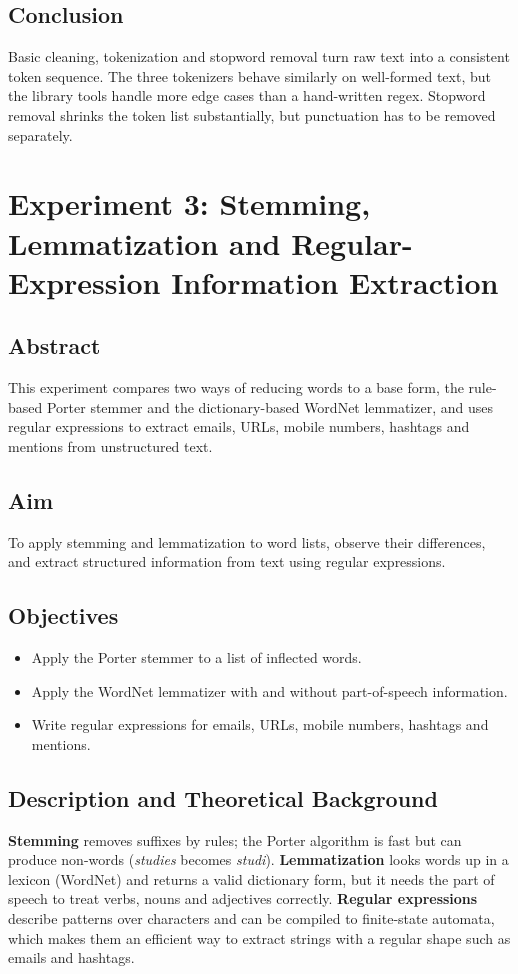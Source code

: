 \documentclass[12pt,a4paper,oneside]{report}
\begin{document}
\section{Conclusion}
Basic cleaning, tokenization and stopword removal turn raw text into a consistent token sequence. The three tokenizers behave similarly on well-formed text, but the library tools handle more edge cases than a hand-written regex. Stopword removal shrinks the token list substantially, but punctuation has to be removed separately.


\chapter{Experiment 3: Stemming, Lemmatization and Regular-Expression Information Extraction}
\section{Abstract}
This experiment compares two ways of reducing words to a base form, the rule-based Porter stemmer and the dictionary-based WordNet lemmatizer, and uses regular expressions to extract emails, URLs, mobile numbers, hashtags and mentions from unstructured text.


\section{Aim}
To apply stemming and lemmatization to word lists, observe their differences, and extract structured information from text using regular expressions.


\section{Objectives}
\begin{itemize}
\item Apply the Porter stemmer to a list of inflected words.
\item Apply the WordNet lemmatizer with and without part-of-speech information.
\item Write regular expressions for emails, URLs, mobile numbers, hashtags and mentions.
\end{itemize}

\section{Description and Theoretical Background}
\textbf{Stemming} removes suffixes by rules; the Porter algorithm is fast but can produce non-words (\emph{studies} becomes \emph{studi}). \textbf{Lemmatization} looks words up in a lexicon (WordNet) and returns a valid dictionary form, but it needs the part of speech to treat verbs, nouns and adjectives correctly. \textbf{Regular expressions} describe patterns over characters and can be compiled to finite-state automata, which makes them an efficient way to extract strings with a regular shape such as emails and hashtags.
\end{document}
